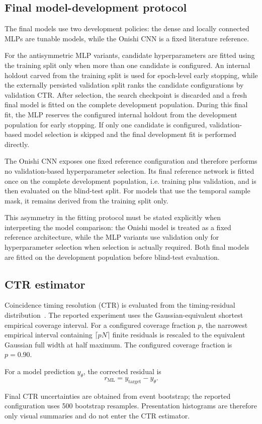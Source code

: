 \subsection{Final model-development protocol}

The final models use two development policies: the dense and locally connected MLPs are tunable models, while the Onishi CNN is a fixed literature reference.

For the antisymmetric MLP variants, candidate hyperparameters are fitted using the training split only when more than one candidate is configured. An internal holdout carved from the training split is used for epoch-level early stopping, while the externally persisted validation split ranks the candidate configurations by validation CTR. After selection, the search checkpoint is discarded and a fresh final model is fitted on the complete development population. During this final fit, the MLP reserves the configured internal holdout from the development population for early stopping. If only one candidate is configured, validation-based model selection is skipped and the final development fit is performed directly.

The Onishi CNN exposes one fixed reference configuration and therefore performs no validation-based hyperparameter selection. Its final reference network is fitted once on the complete development population, i.e. training plus validation, and is then evaluated on the blind-test split. For models that use the temporal sample mask, it remains derived from the training split only.

This asymmetry in the fitting protocol must be stated explicitly when interpreting the model comparison: the Onishi model is treated as a fixed reference architecture, while the MLP variants use validation only for hyperparameter selection when selection is actually required. Both final models are fitted on the development population before blind-test evaluation.

\subsection{CTR estimator}\label{sec:ctr-estimator}

Coincidence timing resolution (CTR) is evaluated from the timing-residual distribution~\cite{surti2015}. The reported experiment uses the Gaussian-equivalent shortest empirical coverage interval. For a configured coverage fraction \(p\), the narrowest empirical interval containing \(\lceil pN\rceil\) finite residuals is rescaled to the equivalent Gaussian full width at half maximum. The configured coverage fraction is \(p=0.90\).

For a model prediction \(y_\theta\), the corrected residual is
\begin{equation}
    r_{\mathrm{ML}}=y_{\mathrm{target}}-y_\theta.
\end{equation}

Final CTR uncertainties are obtained from event bootstrap; the reported configuration uses 500 bootstrap resamples. Presentation histograms are therefore only visual summaries and do not enter the CTR estimator.
